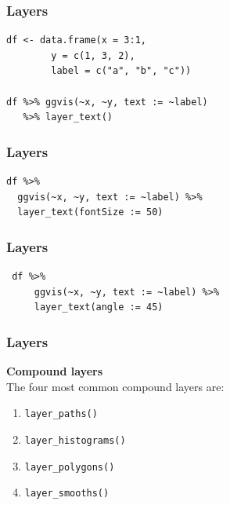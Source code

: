 \documentclass[MASTER.tex]{subfiles}
\begin{document}
\begin{frame}[fragile]
	\frametitle{Layers}
\Large
	\begin{framed}
		\begin{verbatim}
df <- data.frame(x = 3:1, 
        y = c(1, 3, 2), 
        label = c("a", "b", "c"))
        
df %>% ggvis(~x, ~y, text := ~label) 
   %>% layer_text()
\end{verbatim}
\end{framed}
\end{frame}
\begin{frame}[fragile]
	\frametitle{Layers}
\vspace{-0.4cm}
\Large
	\begin{framed}
		\begin{verbatim}
df %>% 
  ggvis(~x, ~y, text := ~label) %>% 
  layer_text(fontSize := 50)
\end{verbatim}
\end{framed}
\end{frame}
\begin{frame}[fragile]
	\frametitle{Layers}
\vspace{-0.4cm}
\Large
	\begin{framed}
		\begin{verbatim}
 df %>% 
     ggvis(~x, ~y, text := ~label) %>% 
     layer_text(angle := 45)
\end{verbatim}
\end{framed}
\end{frame}

\begin{frame}[fragile]
	\frametitle{Layers}
\Large
\vspace{-1.5cm}
\textbf{Compound layers}\\
The four most common compound layers are:

\begin{enumerate}
\item \texttt{layer\_paths()}
\item \texttt{layer\_histograms()} 
\item \texttt{layer\_polygons()}
\item \texttt{layer\_smooths()}
\end{enumerate}
\end{frame}
\end{document}
